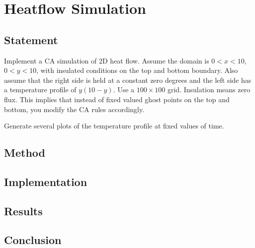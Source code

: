 \section{Heatflow Simulation}

\subsection{Statement}
Implement a CA simulation of 2D heat flow.
Assume the domain is $0 < x < 10$, $0 < y < 10$, with insulated conditions on the top and bottom boundary.
Also assume that the right side is held at a constant zero degrees and the left side has a temperature profile of $y(10-y)$.
Use a $100 \times 100$ grid.
Insulation means zero flux. This implies that instead of fixed valued ghost points on the top and bottom, you modify the CA rules accordingly.

Generate several plots of the temperature profile at fixed values of time.

\subsection{Method}
\subsection{Implementation}
\subsection{Results}
\subsection{Conclusion}
